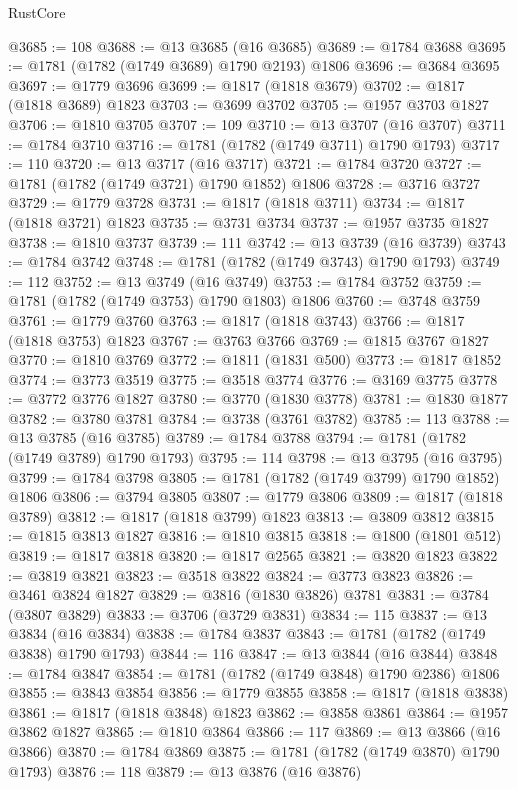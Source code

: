 \begin{lexlean}{RustCore}
\begin{coremodule}
@3685 := 108
@3688 := @13 @3685 (@16 @3685)
@3689 := @1784 @3688
@3695 := @1781 (@1782 (@1749 @3689) @1790 @2193) @1806
@3696 := @3684 @3695
@3697 := @1779 @3696
@3699 := @1817 (@1818 @3679)
@3702 := @1817 (@1818 @3689) @1823
@3703 := @3699 @3702
@3705 := @1957 @3703 @1827
@3706 := @1810 @3705
@3707 := 109
@3710 := @13 @3707 (@16 @3707)
@3711 := @1784 @3710
@3716 := @1781 (@1782 (@1749 @3711) @1790 @1793)
@3717 := 110
@3720 := @13 @3717 (@16 @3717)
@3721 := @1784 @3720
@3727 := @1781 (@1782 (@1749 @3721) @1790 @1852) @1806
@3728 := @3716 @3727
@3729 := @1779 @3728
@3731 := @1817 (@1818 @3711)
@3734 := @1817 (@1818 @3721) @1823
@3735 := @3731 @3734
@3737 := @1957 @3735 @1827
@3738 := @1810 @3737
@3739 := 111
@3742 := @13 @3739 (@16 @3739)
@3743 := @1784 @3742
@3748 := @1781 (@1782 (@1749 @3743) @1790 @1793)
@3749 := 112
@3752 := @13 @3749 (@16 @3749)
@3753 := @1784 @3752
@3759 := @1781 (@1782 (@1749 @3753) @1790 @1803) @1806
@3760 := @3748 @3759
@3761 := @1779 @3760
@3763 := @1817 (@1818 @3743)
@3766 := @1817 (@1818 @3753) @1823
@3767 := @3763 @3766
@3769 := @1815 @3767 @1827
@3770 := @1810 @3769
@3772 := @1811 (@1831 @500)
@3773 := @1817 @1852
@3774 := @3773 @3519
@3775 := @3518 @3774
@3776 := @3169 @3775
@3778 := @3772 @3776 @1827
@3780 := @3770 (@1830 @3778)
@3781 := @1830 @1877
@3782 := @3780 @3781
@3784 := @3738 (@3761 @3782)
@3785 := 113
@3788 := @13 @3785 (@16 @3785)
@3789 := @1784 @3788
@3794 := @1781 (@1782 (@1749 @3789) @1790 @1793)
@3795 := 114
@3798 := @13 @3795 (@16 @3795)
@3799 := @1784 @3798
@3805 := @1781 (@1782 (@1749 @3799) @1790 @1852) @1806
@3806 := @3794 @3805
@3807 := @1779 @3806
@3809 := @1817 (@1818 @3789)
@3812 := @1817 (@1818 @3799) @1823
@3813 := @3809 @3812
@3815 := @1815 @3813 @1827
@3816 := @1810 @3815
@3818 := @1800 (@1801 @512)
@3819 := @1817 @3818
@3820 := @1817 @2565
@3821 := @3820 @1823
@3822 := @3819 @3821
@3823 := @3518 @3822
@3824 := @3773 @3823
@3826 := @3461 @3824 @1827
@3829 := @3816 (@1830 @3826) @3781
@3831 := @3784 (@3807 @3829)
@3833 := @3706 (@3729 @3831)
@3834 := 115
@3837 := @13 @3834 (@16 @3834)
@3838 := @1784 @3837
@3843 := @1781 (@1782 (@1749 @3838) @1790 @1793)
@3844 := 116
@3847 := @13 @3844 (@16 @3844)
@3848 := @1784 @3847
@3854 := @1781 (@1782 (@1749 @3848) @1790 @2386) @1806
@3855 := @3843 @3854
@3856 := @1779 @3855
@3858 := @1817 (@1818 @3838)
@3861 := @1817 (@1818 @3848) @1823
@3862 := @3858 @3861
@3864 := @1957 @3862 @1827
@3865 := @1810 @3864
@3866 := 117
@3869 := @13 @3866 (@16 @3866)
@3870 := @1784 @3869
@3875 := @1781 (@1782 (@1749 @3870) @1790 @1793)
@3876 := 118
@3879 := @13 @3876 (@16 @3876)

\end{coremodule}
\end{lexlean}
